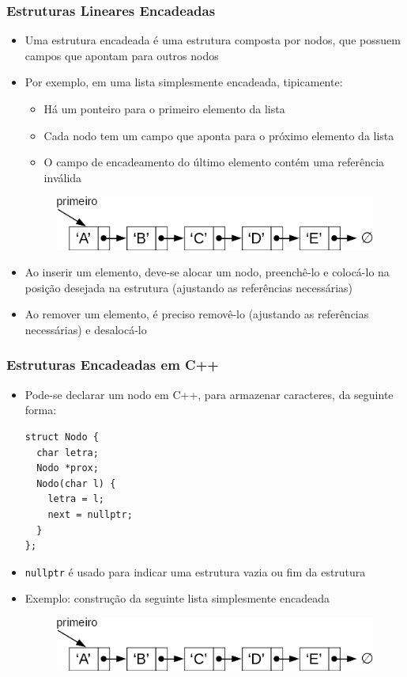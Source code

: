 \documentclass[aspectratio=169]{beamer}
\begin{document}
\begin{frame}\frametitle{Estruturas Lineares Encadeadas}
\begin{itemize}
	\item Uma estrutura encadeada é uma estrutura composta por nodos, que possuem campos que apontam para outros nodos
	\item Por exemplo, em uma lista simplesmente encadeada, tipicamente:
	\begin{itemize}
		\item Há um ponteiro para o primeiro elemento da lista
		\item Cada nodo tem um campo que aponta para o próximo elemento da lista
		\item O campo de encadeamento do último elemento contém uma referência inválida
	\end{itemize}
\begin{figure}[h]
	\centering
	\includegraphics[height=0.15\paperheight]{imagens/lista_simplesmente_encadeada2.png}
\end{figure}
	\item Ao inserir um elemento, deve-se alocar um nodo, preenchê-lo e colocá-lo na posição desejada na estrutura (ajustando as referências necessárias)
	\item Ao remover um elemento, é preciso removê-lo (ajustando as referências necessárias) e desalocá-lo
\end{itemize}
\end{frame}

\begin{frame}[fragile]\frametitle{Estruturas Encadeadas em C++}
\begin{itemize}
	\item Pode-se declarar um nodo em C++, para armazenar caracteres, da seguinte forma:
\begin{lstlisting}[basicstyle=\ttfamily\scriptsize]
struct Nodo {
  char letra;
  Nodo *prox;
  Nodo(char l) {
    letra = l;
    next = nullptr;
  }
};
\end{lstlisting}
	\item \texttt{nullptr} é usado para indicar uma estrutura vazia ou fim da estrutura
	\item Exemplo: construção da seguinte lista simplesmente encadeada
\begin{figure}[h]
	\centering
	\includegraphics[height=0.15\paperheight]{imagens/lista_simplesmente_encadeada2.png}
\end{figure}
\end{itemize}
\end{frame}
\end{document}
